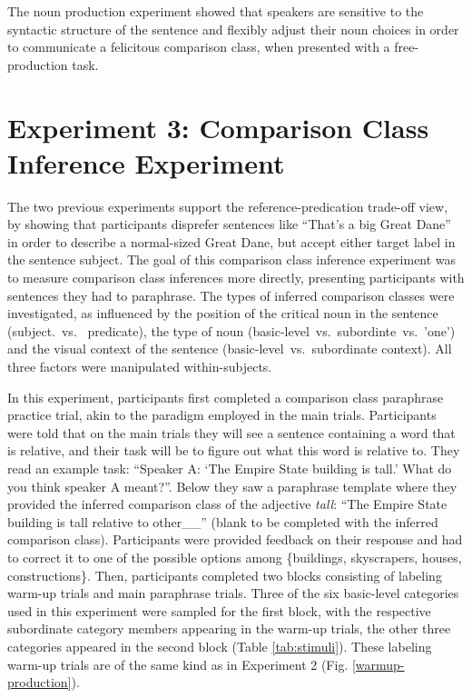The noun production experiment showed that speakers are sensitive to the syntactic structure of the sentence and flexibly adjust their noun choices in order to communicate a felicitous comparison class, when presented with a free-production task.  
 
 
\section{Experiment 3: Comparison Class Inference Experiment}
The two previous experiments support the reference-predication trade-off view, by showing that participants disprefer sentences like “That’s a big Great Dane” in order to describe a normal-sized Great Dane, but accept either target label in the sentence subject. The goal of this comparison class inference experiment was to measure comparison class inferences more directly, presenting participants with sentences they had to paraphrase. The types of inferred comparison classes were investigated, as influenced by the position of the critical noun in the sentence (subject.~vs.~ predicate), the type of noun (basic-level~vs.~subordinte~vs.~'one') and the visual context of the sentence (basic-level~vs.~subordinate context). All three factors were manipulated within-subjects.

In this experiment, participants first completed a comparison class paraphrase practice trial, akin to the paradigm employed in the main trials. Participants were told that on the main trials they will see a sentence containing a word that is relative, and their task will be to figure out what this word is relative to. They read an example task: “Speaker A: ‘The Empire State building is tall.’ What do you think speaker A meant?”. Below they saw a paraphrase template where they provided the inferred comparison class of the adjective \emph{tall}: “The Empire State building is tall relative to other\_\_” (blank to be completed with the inferred comparison class). Participants were provided feedback on their response and had to correct it to one of the possible options among \{buildings, skyscrapers, houses, constructions\}. 
Then, participants completed two blocks consisting of labeling warm-up trials and main paraphrase trials. Three of the six basic-level categories used in this experiment were sampled for the first block, with the respective subordinate category members appearing in the warm-up trials, the other three categories appeared in the second block (Table \ref{tab:stimuli}). These labeling warm-up trials are of the same kind as in Experiment 2 (Fig. \ref{warmup-production}). 

